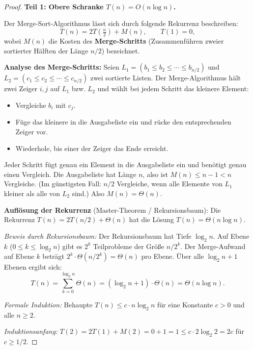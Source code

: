 ﻿\documentclass[a4paper,12pt]{report}
\theoremstyle{definition}
\begin{document}
\begin{proof}
    \textbf{Teil 1: Obere Schranke $T(n) = O(n \log n)$.}

    Der Merge-Sort-Algorithmus lässt sich durch folgende Rekurrenz
    beschreiben:
    \[
        T(n) = 2 T\!\left(\tfrac{n}{2}\right) + M(n),
        \qquad T(1) = 0,
    \]
    wobei $M(n)$ die Kosten des \textbf{Merge-Schritts}
    (Zusammenführen zweier sortierter Hälften der Länge $n/2$)
    bezeichnet.

    \textbf{Analyse des Merge-Schritts:}
    Seien $L_1 = (b_1 \leq b_2 \leq \cdots \leq b_{n/2})$ und
    $L_2 = (c_1 \leq c_2 \leq \cdots \leq c_{n/2})$ zwei sortierte
    Listen. Der Merge-Algorithmus hält zwei Zeiger $i, j$ auf $L_1$
    bzw. $L_2$ und wählt bei jedem Schritt das kleinere Element:

    \begin{itemize}
        \item[-] Vergleiche $b_i$ mit $c_j$.
        \item[-] Füge das kleinere in die Ausgabeliste ein und
              rücke den entsprechenden Zeiger vor.
        \item[-] Wiederhole, bis einer der Zeiger das Ende erreicht.
    \end{itemize}

    Jeder Schritt fügt genau ein Element in die Ausgabeliste ein
    und benötigt genau einen Vergleich. Die Ausgabeliste hat Länge $n$,
    also ist $M(n) \leq n - 1 < n$ Vergleiche.
    (Im günstigsten Fall: $n/2$ Vergleiche, wenn alle Elemente von
    $L_1$ kleiner als alle von $L_2$ sind.)
    Also $M(n) = \Theta(n)$.

    \textbf{Auflösung der Rekurrenz} (Master-Theorem / Rekursionsbaum):
    Die Rekurrenz $T(n) = 2T(n/2) + \Theta(n)$ hat die Lösung
    $T(n) = \Theta(n \log n)$.

    \emph{Beweis durch Rekursionsbaum:}
    Der Rekursionsbaum hat Tiefe $\log_2 n$. Auf Ebene $k$
    ($0 \leq k \leq \log_2 n$) gibt es $2^k$ Teilprobleme der
    Größe $n/2^k$. Der Merge-Aufwand auf Ebene $k$ beträgt
    $2^k \cdot \Theta(n/2^k) = \Theta(n)$ pro Ebene.
    Über alle $\log_2 n + 1$ Ebenen ergibt sich:
    \[
        T(n) = \sum_{k=0}^{\log_2 n} \Theta(n)
        = (\log_2 n + 1) \cdot \Theta(n)
        = \Theta(n \log n).
    \]

    \emph{Formale Induktion:} Behaupte $T(n) \leq c \cdot n \log_2 n$
    für eine Konstante $c > 0$ und alle $n \geq 2$.

    \emph{Induktionsanfang:} $T(2) = 2T(1) + M(2) = 0 + 1 = 1
    \leq c \cdot 2 \log_2 2 = 2c$ für $c \geq 1/2$.


\end{proof}
\end{document}
